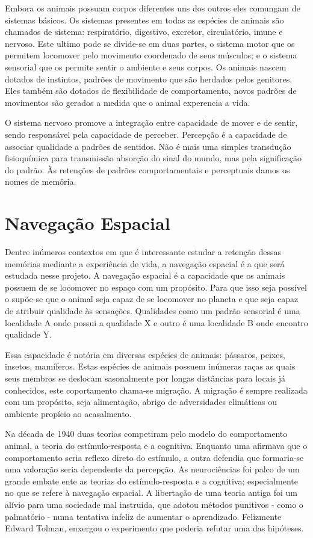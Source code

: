 Embora os animais possuam corpos diferentes uns dos outros eles comungam de sistemas básicos.
Os sistemas presentes em todas as espécies de animais são chamados de sistema: respiratório, digestivo, excretor, circulatório, imune e nervoso.
Este ultimo pode se divide-se em duas partes, o sistema motor que os permitem locomover pelo movimento coordenado de seus músculos; e o sistema sensorial que os permite sentir o ambiente e seus corpos.
Os animais nascem dotados de instintos, padrões de movimento que são herdados pelos genitores.
Eles também são dotados de flexibilidade de comportamento, novos padrões de movimentos são gerados a medida que o animal experencia a vida.

O sistema nervoso promove a integração entre capacidade de mover e de sentir, sendo responsável pela capacidade de perceber.
Percepção é a capacidade de associar qualidade a padrões de sentidos.
Não é mais uma simples transdução fisioquímica para transmissão absorção do sinal do mundo, mas pela significação do padrão.
Às retenções de padrões comportamentais e perceptuais damos os nomes de memória.

\section{Navegação Espacial}

Dentre inúmeros contextos em que é interessante estudar a retenção dessas memórias mediante a experiência de vida, a navegação espacial é a que será estudada nesse projeto.
A navegação espacial é a capacidade que os animais possuem de se locomover no espaço com um propósito.
Para que isso seja possível o supõe-se que o animal seja capaz de se locomover no planeta e que seja capaz de atribuir qualidade às sensações.
Qualidades como um padrão sensorial é uma localidade A onde possui a qualidade X e outro é uma localidade B onde encontro qualidade Y.

Essa capacidade é notória em diversas espécies de animais: pássaros, peixes, insetos, mamíferos.
Estas espécies de animais possuem inúmeras raças as quais seus membros se deslocam sasonalmente por longas distâncias para locais já conhecidos, este coportamento chama-se migração.
A migração é sempre realizada com um propósito, seja alimentação, abrigo de adversidades climáticas ou ambiente propício ao acasalmento.

Na década de 1940 duas teorias competiram pelo modelo do comportamento animal, a teoria do estímulo-resposta e a cognitiva.
Enquanto uma afirmava que o comportamento seria reflexo direto do estímulo, a outra defendia que formaria-se uma valoração
seria dependente da percepção.
As neurociências foi palco de um grande embate ente as teorias do estímulo-resposta e a cognitiva; especialmente no que se refere à navegação espacial.
A libertação de uma teoria antiga foi um alívio para uma sociedade mal instruida, que adotou métodos punitivos - como o palmatório - numa tentativa infeliz de aumentar o aprendizado.
Felizmente Edward Tolman, enxergou o experimento que poderia refutar uma das hipóteses.

